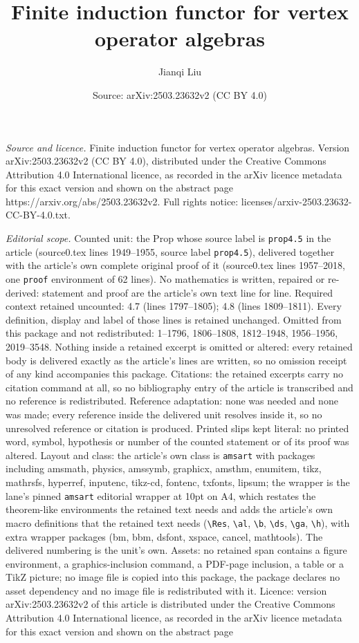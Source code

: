 \documentclass[10pt,a4paper]{amsart}
\title[Finite induction functor for vertex operator algebras]{Finite induction functor for vertex operator algebras}
\author{Jianqi Liu}
\date{Source: arXiv:2503.23632v2 (CC BY 4.0)}
\begin{document}
\maketitle

\noindent\emph{Source and licence.} Finite induction functor for vertex operator algebras. Version arXiv:2503.23632v2 (CC BY 4.0), distributed under the Creative Commons Attribution 4.0 International licence, as recorded in the arXiv licence metadata for this exact version and shown on the abstract page https://arxiv.org/abs/2503.23632v2. Full rights notice: licenses/arxiv-2503.23632-CC-BY-4.0.txt.\par\smallskip

\noindent\textit{Editorial scope.} Counted unit: the Prop whose source label is \texttt{prop4.5} in the article (source0.tex lines 1949--1955, source label \texttt{prop4.5}), delivered together with the article's own complete original proof of it (source0.tex lines 1957--2018, one \texttt{proof} environment of 62 lines). No mathematics is written, repaired or re-derived: statement and proof are the article's own text line for line. Required context retained uncounted: 4.7 (lines 1797--1805); 4.8 (lines 1809--1811). Every definition, display and label of those lines is retained unchanged. Omitted from this package and not redistributed: 1--1796, 1806--1808, 1812--1948, 1956--1956, 2019--3548. Nothing inside a retained excerpt is omitted or altered: every retained body is delivered exactly as the article's lines are written, so no omission receipt of any kind accompanies this package. Citations: the retained excerpts carry no citation command at all, so no bibliography entry of the article is transcribed and no reference is redistributed. Reference adaptation: none was needed and none was made; every reference inside the delivered unit resolves inside it, so no unresolved reference or citation is produced. Printed slips kept literal: no printed word, symbol, hypothesis or number of the counted statement or of its proof was altered. Layout and class: the article's own class is \texttt{amsart} with packages including amsmath, physics, amssymb, graphicx, amsthm, enumitem, tikz, mathrsfs, hyperref, inputenc, tikz-cd, fontenc, txfonts, lipsum; the wrapper is the lane's pinned \texttt{amsart} editorial wrapper at 10pt on A4, which restates the theorem-like environments the retained text needs and adds the article's own macro definitions that the retained text needs (\texttt{\textbackslash Res}, \texttt{\textbackslash al}, \texttt{\textbackslash b}, \texttt{\textbackslash ds}, \texttt{\textbackslash ga}, \texttt{\textbackslash h}), with extra wrapper packages (bm, bbm, dsfont, xspace, cancel, mathtools). The delivered numbering is the unit's own. Assets: no retained span contains a figure environment, a graphics-inclusion command, a PDF-page inclusion, a table or a TikZ picture; no image file is copied into this package, the package declares no asset dependency and no image file is redistributed with it. Licence: version arXiv:2503.23632v2 of this article is distributed under the Creative Commons Attribution 4.0 International licence, as recorded in the arXiv licence metadata for this exact version and shown on the abstract page 
\end{document}
